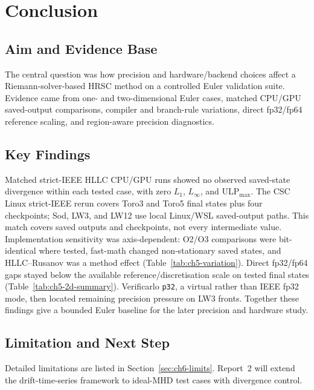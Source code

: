 
\chapter{Conclusion}

\section{Aim and Evidence Base}
The central question was how precision and hardware/backend choices affect a Riemann-solver-based HRSC method on a controlled Euler validation suite. Evidence came from one- and two-dimensional Euler cases, matched CPU/GPU saved-output comparisons, compiler and branch-rule variations, direct fp32/fp64 reference scaling, and region-aware precision diagnostics.

\section{Key Findings}
Matched strict-IEEE HLLC CPU/GPU runs showed no observed saved-state divergence within each tested case, with zero \(L_1\), \(L_\infty\), and \(\mathrm{ULP}_{\max}\). The CSC Linux strict-IEEE rerun covers Toro3 and Toro5 final states plus four checkpoints; Sod, LW3, and LW12 use local Linux/WSL saved-output paths. This match covers saved outputs and checkpoints, not every intermediate value. Implementation sensitivity was axis-dependent: O2/O3 comparisons were bit-identical where tested, fast-math changed non-stationary saved states, and HLLC--Rusanov was a method effect (Table~\ref{tab:ch5-variation}). Direct fp32/fp64 gaps stayed below the available reference/discretisation scale on tested final states (Table~\ref{tab:ch5-2d-summary}). Verificarlo \texttt{p32}, a virtual rather than IEEE fp32 mode, then located remaining precision pressure on LW3 fronts. Together these findings give a bounded Euler baseline for the later precision and hardware study.

\section{Limitation and Next Step}
Detailed limitations are listed in Section~\ref{sec:ch6-limits}. Report~2 will extend the drift-time-series framework to ideal-MHD test cases with divergence control.

